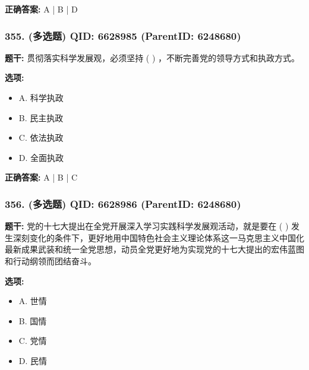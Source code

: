 \documentclass[12pt,UTF8]{ctexart}
\begin{document}
\textbf{正确答案:}
A | B | D

\vspace{0.3em}\hrulefill\vspace{0.7em}

\subsubsection*{355. (多选题) \small QID: 6628985 (ParentID: 6248680)}

\textbf{题干:}
贯彻落实科学发展观，必须坚持  ( )  ，不断完善党的领导方式和执政方式。



\textbf{选项:}
\begin{itemize}[leftmargin=*]

  \item A. 科学执政

  \item B. 民主执政

  \item C. 依法执政

  \item D. 全面执政

\end{itemize}

\textbf{正确答案:}
A | B | C

\vspace{0.3em}\hrulefill\vspace{0.7em}

\subsubsection*{356. (多选题) \small QID: 6628986 (ParentID: 6248680)}

\textbf{题干:}
党的十七大提出在全党开展深入学习实践科学发展观活动，就是要在  ( )  发生深刻变化的条件下，更好地用中国特色社会主义理论体系这一马克思主义中国化最新成果武装和统一全党思想，动员全党更好地为实现党的十七大提出的宏伟蓝图和行动纲领而团结奋斗。



\textbf{选项:}
\begin{itemize}[leftmargin=*]

  \item A. 世情

  \item B. 国情

  \item C. 党情

  \item D. 民情

\end{itemize}
\end{document}
